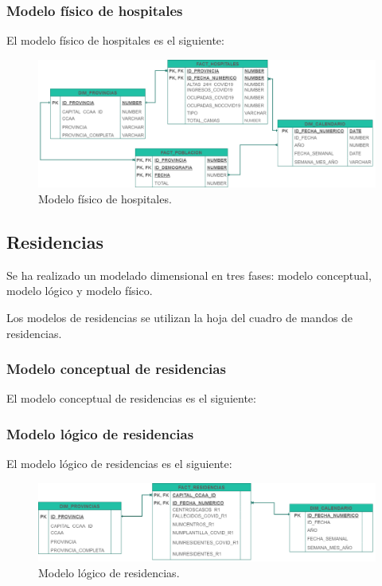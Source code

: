 \subsubsection{Modelo físico de hospitales}
El modelo físico de hospitales es el siguiente:
\begin{figure}[h]
    \advance\leftskip-1cm 
    \includegraphics[scale=0.6]{img/hospitales_fisico.png}
    \caption{Modelo físico de hospitales.}
\end{figure}

\subsection{Residencias}
Se ha realizado un modelado dimensional en tres fases: modelo conceptual, modelo lógico y modelo físico.

Los modelos de residencias se utilizan la hoja del cuadro de mandos de residencias.

\subsubsection{Modelo conceptual de residencias} El modelo conceptual de residencias es el siguiente:

\subsubsection{Modelo lógico de residencias}
El modelo lógico de residencias es el siguiente:

\begin{figure}[h]
    \advance\leftskip-1.5cm 
    \includegraphics[scale=0.6]{img/residencias_logico.png}
    \caption{Modelo lógico de residencias.}
\end{figure}

